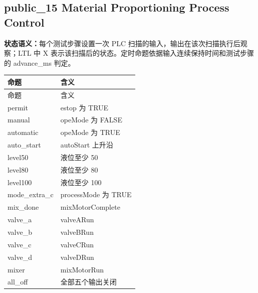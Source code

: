 \subsection{{\ttfamily public\_15} Material Proportioning Process Control}

\noindent\textbf{状态语义：}每个测试步骤设置一次 PLC 扫描的输入，输出在该次扫描执行后观察；LTL 中 X 表示该扫描后的状态。定时命题依据输入连续保持时间和测试步骤的 advance\_ms 判定。

\begin{longtable}{L{3.3cm}L{10.0cm}}

\toprule

命题 & 含义\\

\midrule

\endfirsthead

\toprule

命题 & 含义\\

\midrule

\endhead

{\ttfamily permit} & estop 为 TRUE\\

{\ttfamily manual} & opeMode 为 FALSE\\

{\ttfamily automatic} & opeMode 为 TRUE\\

{\ttfamily auto\_start} & autoStart 上升沿\\

{\ttfamily level50} & 液位至少 50\\

{\ttfamily level80} & 液位至少 80\\

{\ttfamily level100} & 液位至少 100\\

{\ttfamily mode\_extra\_c} & processMode 为 TRUE\\

{\ttfamily mix\_done} & mixMotorComplete\\

{\ttfamily valve\_a} & valveARun\\

{\ttfamily valve\_b} & valveBRun\\

{\ttfamily valve\_c} & valveCRun\\

{\ttfamily valve\_d} & valveDRun\\

{\ttfamily mixer} & mixMotorRun\\

{\ttfamily all\_off} & 全部五个输出关闭\\

\bottomrule

\end{longtable}

